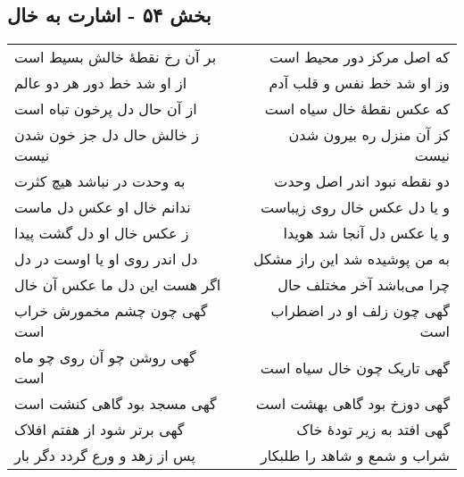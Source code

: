 \begin{center}
\section*{بخش ۵۴ - اشارت به خال}
\label{sec:sh054}
\begin{longtable}{l p{0.5cm} r}
بر آن رخ نقطهٔ خالش بسیط است
&&
که اصل مرکز دور محیط است
\\
از او شد خط دور هر دو عالم
&&
وز او شد خط نفس و قلب آدم
\\
از آن حال دل پرخون تباه است
&&
که عکس نقطهٔ خال سیاه است
\\
ز خالش حال دل جز خون شدن نیست
&&
کز آن منزل ره بیرون شدن نیست
\\
به وحدت در نباشد هیچ کثرت
&&
دو نقطه نبود اندر اصل وحدت
\\
ندانم خال او عکس دل ماست
&&
و یا دل عکس خال روی زیباست
\\
ز عکس خال او دل گشت پیدا
&&
و یا عکس دل آنجا شد هویدا
\\
دل اندر روی او یا اوست در دل
&&
به من پوشیده شد این راز مشکل
\\
اگر هست این دل ما عکس آن خال
&&
چرا می‌باشد آخر مختلف حال
\\
گهی چون چشم مخمورش خراب است
&&
گهی چون زلف او در اضطراب است
\\
گهی روشن چو آن روی چو ماه است
&&
گهی تاریک چون خال سیاه است
\\
گهی مسجد بود گاهی کنشت است
&&
گهی دوزخ بود گاهی بهشت است
\\
گهی برتر شود از هفتم افلاک
&&
گهی افتد به زیر تودهٔ خاک
\\
پس از زهد و ورع گردد دگر بار
&&
شراب و شمع و شاهد را طلبکار
\\
\end{longtable}
\end{center}
